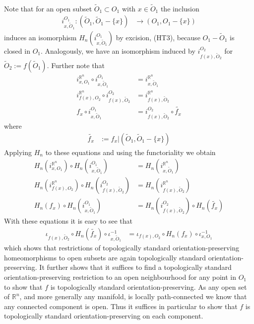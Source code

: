 \\
Note that for an open subset $\tilde{O}_{1} \subset O_{1}$ with $x \in \tilde{O}_{1}$ the inclusion
\begin{align*}
  i_{x,\tilde{O}_{1}}^{O_{1}}
  \colon
  (\tilde{O}_{1},\tilde{O}_{1} - \lbrace x \rbrace)
  &\to
  (O_{1},O_{1} - \lbrace x \rbrace)
\end{align*}
induces an isomorphism $H_{n}(i_{x,\tilde{O}_{1}}^{O_{1}})$ by excision, (HT3), because $O_{1} - \tilde{O}_{1}$ is closed in $O_{1}$. Analogously, we have an isomorphism induced by $i_{f(x),\tilde{O}_{2}}^{O_{2}}$ for $\tilde{O}_{2} := f(\tilde{O}_{1})$. Further note that
\begin{align*}
  i_{x,O_{1}}^{\mathbb{R}^{n}}
  \circ
  i_{x,\tilde{O}_{1}}^{O_{1}}
  &=
  i_{x,\tilde{O}_{1}}^{\mathbb{R}^{n}}
  \\
  i_{f(x),O_{2}}^{\mathbb{R}^{n}}
  \circ
  i_{f(x),\tilde{O}_{2}}^{O_{2}}
  &=
  i_{f(x),\tilde{O}_{2}}^{\mathbb{R}^{n}}
  \\
  f_{x}
  \circ
  i_{x,\tilde{O}_{1}}^{O_{1}}
  &=
  i_{f(x),\tilde{O}_{2}}^{O_{2}}
  \circ
  \tilde{f_{x}}
\end{align*}
where
\begin{align*}
  \tilde{f_{x}}
  &:=
  f_{x}
  \vert
  (\tilde{O}_{1},\tilde{O}_{1} - \lbrace x \rbrace)
\end{align*}
Applying $H_{n}$ to these equations and using the functoriality we obtain
\begin{align*}
  H_{n}(i_{x,O_{1}}^{\mathbb{R}^{n}})
  \circ
  H_{n}(i_{x,\tilde{O}_{1}}^{O_{1}})
  &=
  H_{n}(i_{x,\tilde{O}_{1}}^{\mathbb{R}^{n}})
  \\
  H_{n}(i_{f(x),O_{2}}^{\mathbb{R}^{n}})
  \circ
  H_{n}(i_{f(x),\tilde{O}_{2}}^{O_{2}})
  &=
  H_{n}(i_{f(x),\tilde{O}_{2}}^{\mathbb{R}^{n}})
  \\
  H_{n}(f_{x})
  \circ
  H_{n}(i_{x,\tilde{O}_{1}}^{O_{1}})
  &=
  H_{n}(i_{f(x),\tilde{O}_{2}}^{O_{2}})
  \circ
  H_{n}(\tilde{f_{x}})
\end{align*}
With these equations it is easy to see that
\begin{align*}
  \iota_{f(x),\tilde{O}_{2}}
  \circ
  H_{n}(\tilde{f_{x}})
  \circ
  \iota_{x,\tilde{O}_{1}}^{-1}
  &=
  \iota_{f(x),O_{2}}
  \circ
  H_{n}(f_{x})
  \circ
  \iota_{x,O_{1}}^{-1}
\end{align*}
which shows that restrictions of topologically standard orientation-preserving homeomorphisms to open subsets are again topologically standard orientation-preserving. It further shows that it suffices to find a topologically standard orientation-preserving restriction to an open neighbourhood for any point in $O_{1}$ to show that $f$ is topologically standard orientation-preserving. As any open set of $\mathbb{R}^{n}$, and more generally any manifold, is locally path-connected we know that any connected component is open. Thus it suffices in particular to show that $f$ is topologically standard orientation-preserving on each component.
